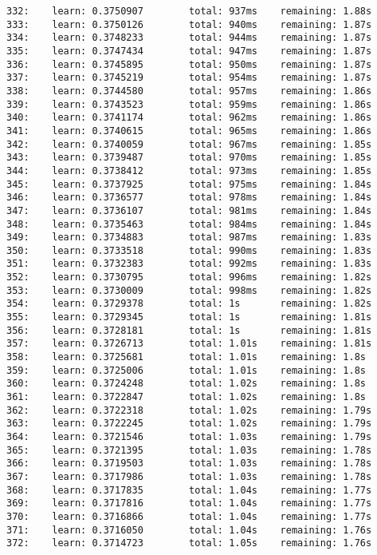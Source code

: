 \documentclass[11pt]{article}
\begin{document}
\begin{Verbatim}[commandchars=\\\{\}]
332:    learn: 0.3750907        total: 937ms    remaining: 1.88s
333:    learn: 0.3750126        total: 940ms    remaining: 1.87s
334:    learn: 0.3748233        total: 944ms    remaining: 1.87s
335:    learn: 0.3747434        total: 947ms    remaining: 1.87s
336:    learn: 0.3745895        total: 950ms    remaining: 1.87s
337:    learn: 0.3745219        total: 954ms    remaining: 1.87s
338:    learn: 0.3744580        total: 957ms    remaining: 1.86s
339:    learn: 0.3743523        total: 959ms    remaining: 1.86s
340:    learn: 0.3741174        total: 962ms    remaining: 1.86s
341:    learn: 0.3740615        total: 965ms    remaining: 1.86s
342:    learn: 0.3740059        total: 967ms    remaining: 1.85s
343:    learn: 0.3739487        total: 970ms    remaining: 1.85s
344:    learn: 0.3738412        total: 973ms    remaining: 1.85s
345:    learn: 0.3737925        total: 975ms    remaining: 1.84s
346:    learn: 0.3736577        total: 978ms    remaining: 1.84s
347:    learn: 0.3736107        total: 981ms    remaining: 1.84s
348:    learn: 0.3735463        total: 984ms    remaining: 1.84s
349:    learn: 0.3734883        total: 987ms    remaining: 1.83s
350:    learn: 0.3733518        total: 990ms    remaining: 1.83s
351:    learn: 0.3732383        total: 992ms    remaining: 1.83s
352:    learn: 0.3730795        total: 996ms    remaining: 1.82s
353:    learn: 0.3730009        total: 998ms    remaining: 1.82s
354:    learn: 0.3729378        total: 1s       remaining: 1.82s
355:    learn: 0.3729345        total: 1s       remaining: 1.81s
356:    learn: 0.3728181        total: 1s       remaining: 1.81s
357:    learn: 0.3726713        total: 1.01s    remaining: 1.81s
358:    learn: 0.3725681        total: 1.01s    remaining: 1.8s
359:    learn: 0.3725006        total: 1.01s    remaining: 1.8s
360:    learn: 0.3724248        total: 1.02s    remaining: 1.8s
361:    learn: 0.3722847        total: 1.02s    remaining: 1.8s
362:    learn: 0.3722318        total: 1.02s    remaining: 1.79s
363:    learn: 0.3722245        total: 1.02s    remaining: 1.79s
364:    learn: 0.3721546        total: 1.03s    remaining: 1.79s
365:    learn: 0.3721395        total: 1.03s    remaining: 1.78s
366:    learn: 0.3719503        total: 1.03s    remaining: 1.78s
367:    learn: 0.3717986        total: 1.03s    remaining: 1.78s
368:    learn: 0.3717835        total: 1.04s    remaining: 1.77s
369:    learn: 0.3717816        total: 1.04s    remaining: 1.77s
370:    learn: 0.3716866        total: 1.04s    remaining: 1.77s
371:    learn: 0.3716050        total: 1.04s    remaining: 1.76s
372:    learn: 0.3714723        total: 1.05s    remaining: 1.76s

\end{Verbatim}
\end{document}
